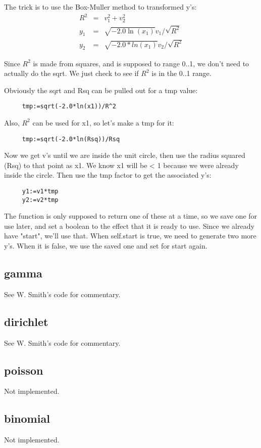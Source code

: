 The trick is to use the Box-Muller method to transformed y's:
\begin{eqnarray}
     R^2 & = & v_1^2 + v_2^2\\
     y_1 & = & \sqrt{-2.0\ln(x_1)} v_1/\sqrt{R^2}\\
     y_2 & = & \sqrt{-2.0*ln(x_1)} v_2/\sqrt{R^2}
\end{eqnarray}

Since $R^2$ is made from squares, and is supposed to range 0..1, we don't
need to actually do the sqrt.  We just check to see if $R^2$ is
in the 0..1 range.
     
Obviously the sqrt and Rsq can be pulled out for a tmp
value:
\begin{verbatim}
     tmp:=sqrt(-2.0*ln(x1))/R^2
\end{verbatim}

Also, $R^2$ can be used for x1, so let's make a tmp for it:
\begin{verbatim}
     tmp:=sqrt(-2.0*ln(Rsq))/Rsq
\end{verbatim}

Now we get v's until we are inside the unit circle, then use
the radius squared (Rsq) to that point as x1.  We know x1
will be < 1 because we were already inside the circle.  Then
use the tmp factor to get the associated y's:
\begin{verbatim}
     y1:=v1*tmp
     y2:=v2*tmp
\end{verbatim}

The function is only supposed to return one of these at a
time, so we save one for use later, and set a boolean to the
effect that it is ready to use.  Since we already have
"start", we'll use that.  When self.start is true, we need to
generate two more y's.  When it is false, we use the saved
one and set for start again.

\subsection*{gamma}
See W. Smith's code for commentary.

\subsection*{dirichlet}
See W. Smith's code for commentary.

\subsection*{poisson}
Not implemented.

\subsection*{binomial}
Not implemented.

